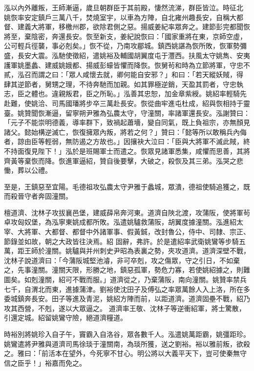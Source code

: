 \begin{pinyinscope}
 泓以內外離叛，王師漸逼，歲旦朝群臣于其前殿，悽然流涕，群臣皆泣。時征北
 姚恢率安定鎮戶三萬八千，焚燒室宇，以車為方陣，自北雍州趣長安，自稱大都督、建義大將軍，移檄州郡，欲除君側之惡。揚威姜紀率眾奔之。建節彭完都聞恢將至，棄陰密，奔還長安。恢至新支，姜紀說恢曰：「國家重將在東，京師空虛，公可輕兵徑襲，事必剋矣。」恢不從，乃南攻郿城。鎮西姚諶為恢所敗，恢軍勢彌盛，長安大震。泓馳使徵紹，遣姚裕及輔國胡翼度屯于灃西。扶風太守姚雋、安夷護軍姚墨蠡、建威姚娥都、揚威彭蠔皆懼而降恢。恢舅茍和時為立節將軍，守忠不貳，泓召而謂之曰：「眾人咸懷去就，卿何能自安邪？」和曰：「若天縱妖賊，得
 肆其逆節者，舅甥之理，不待奔馳而加親。如其罪極逆銷，天盈其罰者，守忠執志，臣之體也。違親叛君，臣之所恥。」泓善其忠恕，加金章紫綬。姚紹率輕騎先赴難，使姚洽、司馬國璠將步卒三萬赴長安。恢從曲牢進屯杜成，紹與恢相持于靈臺。姚贊聞恢漸逼，留寧朔尹雅為弘農太守，守潼關，率諸軍還長安。泓謝贊曰：「元子不能崇明德義，導率群下，致禍起蕭墻，變自同氣，既上負祖宗，亦無顏見諸父。懿始構逆滅亡，恢復擁眾內叛，將若之何？」贊曰：「懿等所以敢稱兵內侮者，諒由臣等輕弱，無防遏之方故也。」因攘袂大泣曰：「臣與大將軍不滅此賊，終
 不持面復見陛下！」泓於是班賜軍士而遣之。恢眾見諸軍悉集，咸懼而思善，其將齊黃等棄恢而降。恢進軍逼紹，贊自後要擊，大破之，殺恢及其三弟。泓哭之悲慟，葬以公禮。



 至是，王鎮惡至宜陽。毛德祖攻弘農太守尹雅于蠡城，眾潰，德祖使騎追獲之，既而殺晉守者奔固潼關。



 檀道濟、沈林子攻拔襄邑堡，建威薛帛奔河東。道濟自陜北渡，攻蒲阪，使將軍茍卓攻匈奴堡，為泓寧東姚成都所敗。泓遣姚驢救蒲阪，胡翼度據潼關。泓進紹太宰、大將軍、大都督、都督中外諸軍事、假黃鋮，改封魯公，侍中、司隸、宗正、節錄並如故，朝之大政皆往決焉。紹
 固辭，弗許。於是遣紹率武衛姚鸞等步騎五萬，距王師於潼關。姚驢與并州刺史尹昭為表裏之勢，夾攻道濟。道濟深壁不戰，沈林子說道濟曰：「今蒲阪城堅池濬，非可卒剋，攻之傷眾，守之引日，不如棄之，先事潼關。潼關天限，形勝之地，鎮惡孤軍，勢危力寡，若使姚紹據之，則難圖矣。如剋潼關，紹可不戰而服。」道濟從之，乃棄蒲阪，南向潼關。姚贊率禁兵七千，自渭北而東，進據蒲津。劉裕使沈田子及傅弘之率眾萬餘人入上洛，所在多委城鎮奔長安。田子等進及青泥，姚紹方陣而前，以距道濟。道濟固壘不戰，紹乃攻其西營，不剋，遂以大眾逼之。
 道濟率王敬、沈林子等逆衝紹軍，將士驚散，引還定城。紹留姚鸞守險，絕道濟糧道。



 時裕別將姚珍入自子午，竇霸入自洛谷，眾各數千人。泓遣姚萬距霸，姚彊距珍。姚鸞遣將尹雅與道濟司馬徐琰于潼關南，為琰所獲，送之劉裕。裕以雅前叛，欲殺之。雅曰：「前活本在望外，今死寧不甘心。明公將以大義平天下，豈可使秦無守信之臣乎！」裕嘉而免之。




\end{pinyinscope}
